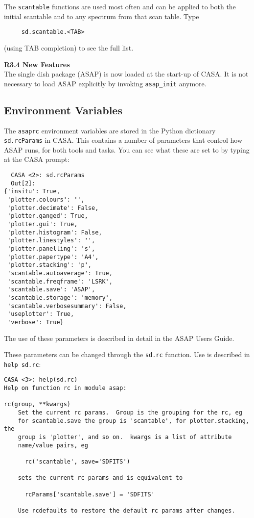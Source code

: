 The {\tt scantable} functions are used most often and can be applied
to both the initial scantable and to any spectrum from that scan
table.  Type
\small
\begin{verbatim}
     sd.scantable.<TAB>
\end{verbatim}
\normalsize
(using TAB completion) to see the full list. 

\medskip
{\bf R3.4 New Features}\\
The single dish package (ASAP) is now loaded at the start-up of CASA. 
It is not necessary to load ASAP explicitly by invoking {\tt asap\_init} anymore.

\subsection{Environment Variables}
\label{subsection:sd.asap.environ}

The {\tt asaprc} environment variables are stored in the Python
dictionary {\tt sd.rcParams} in CASA.  This contains a number
of parameters that control how ASAP runs, for both tools and
tasks.  You can see what these are set to by typing at the
CASA prompt:

\small
\begin{verbatim}
  CASA <2>: sd.rcParams
  Out[2]: 
{'insitu': True,
 'plotter.colours': '',
 'plotter.decimate': False,
 'plotter.ganged': True,
 'plotter.gui': True,
 'plotter.histogram': False,
 'plotter.linestyles': '',
 'plotter.panelling': 's',
 'plotter.papertype': 'A4',
 'plotter.stacking': 'p',
 'scantable.autoaverage': True,
 'scantable.freqframe': 'LSRK',
 'scantable.save': 'ASAP',
 'scantable.storage': 'memory',
 'scantable.verbosesummary': False,
 'useplotter': True,
 'verbose': True}
\end{verbatim}
\normalsize

The use of these parameters is described in detail in the
ASAP Users Guide.

These parameters can be changed through the {\tt sd.rc}
function.  Use is described in {\tt help sd.rc}:

\small
\begin{verbatim}
CASA <3>: help(sd.rc)
Help on function rc in module asap:

rc(group, **kwargs)
    Set the current rc params.  Group is the grouping for the rc, eg
    for scantable.save the group is 'scantable', for plotter.stacking, the
    group is 'plotter', and so on.  kwargs is a list of attribute
    name/value pairs, eg
    
      rc('scantable', save='SDFITS')
    
    sets the current rc params and is equivalent to
    
      rcParams['scantable.save'] = 'SDFITS'
    
    Use rcdefaults to restore the default rc params after changes.
\end{verbatim}
\normalsize

